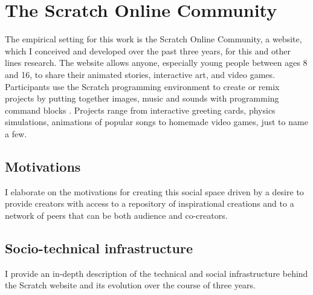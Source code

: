 \chapter{The Scratch Online Community}
The empirical setting for this work is the Scratch Online Community, a website, which I conceived and developed over the past three years, for this and other lines research.
The website allows anyone, especially young people between ages 8 and 16, to share their animated stories, interactive art, and video games. Participants use the Scratch programming environment to create or remix projects by putting together images, music and sounds with programming command blocks \citep{resnick_scratch:_2009}.
Projects range from interactive greeting cards, physics simulations, animations of popular songs to homemade video games, just to name a few.  

\section{Motivations}

I elaborate on the motivations for creating this social space driven by a desire to provide creators with access to a repository of inspirational creations and to a network of peers that can be both audience and co-creators.

\section{Socio-technical infrastructure}
I provide an in-depth description of the technical and social infrastructure behind the Scratch website and its evolution over the course of three years.  
